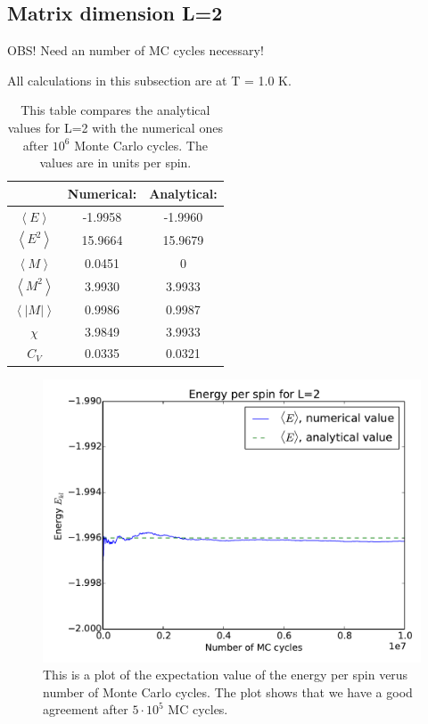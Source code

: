 \subsection{Matrix dimension L=2}

OBS! Need an number of MC cycles necessary!

All calculations in this subsection are at T = 1.0 K. 

\begin{table}\caption{This table compares the analytical values for L=2 with the numerical ones after $10^6$ Monte Carlo cycles. The values are in units per spin.}\label{tab:compare_values}
\begin{tabular}{ccc}
& Numerical: & Analytical:\\ \hline
$\left<E\right>$ &   -1.9958 & -1.9960\\
$\left<E^2\right>$ &   15.9664 & 15.9679\\
$\left<M\right>$ &    0.0451 & 0\\
$\left<M^2\right>$ &    3.9930 & 3.9933\\
$\left<|M|\right>$ &    0.9986 & 0.9987\\
$\chi$ &   3.9849 & 3.9933\\
  $C_V$& 0.0335 & 0.0321\\
\end{tabular}
\end{table}

\begin{figure}[H]
\includegraphics[width=\linewidth]{../results/4b/L_2_energy}\caption{This is a plot of the expectation value of the energy per spin verus number of Monte Carlo cycles. The plot shows that we have a good agreement after $ 5 \cdot 10^{5} $ MC cycles.}\label{fig:L_2_energy}
\end{figure}

